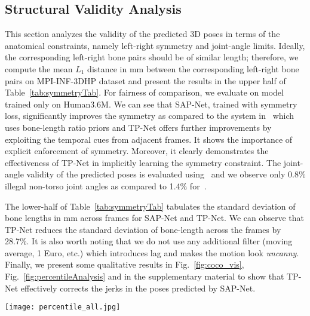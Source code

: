 \documentclass[runningheads]{llncs}
\begin{document}
\vspace{-1em}
\subsection{Structural Validity Analysis}
This section analyzes the validity of the predicted 3D poses in terms of the anatomical constraints, namely left-right symmetry and joint-angle limits. Ideally, the corresponding left-right bone pairs should be of similar length; therefore, we compute the mean $L_1$ distance in mm between the corresponding left-right bone pairs on MPI-INF-3DHP dataset and present the results in the upper half of Table~\ref{tab:symmetryTab}. For fairness of comparison, we evaluate on model trained only on Human3.6M. We can see that SAP-Net, trained with symmetry loss, significantly improves the symmetry as compared to the system in~\cite{Zhou_2017_ICCV} which uses bone-length ratio priors and TP-Net offers further improvements by exploiting the temporal cues from adjacent frames. It shows the importance of explicit enforcement of symmetry. Moreover, it clearly demonstrates the effectiveness of TP-Net in implicitly learning the symmetry constraint. The joint-angle validity of the predicted poses is evaluated using~\cite{akhter2015pose} and we observe only 0.8\% illegal non-torso joint angles as compared to 1.4\% for~\cite{Zhou_2017_ICCV}.

The lower-half of Table~\ref{tab:symmetryTab} tabulates the standard deviation of bone lengths in mm across frames for SAP-Net and TP-Net. We can observe that TP-Net reduces the standard deviation of bone-length across the frames by 28.7\%. It is also worth noting that we do not use any additional filter (moving average, 1 Euro, etc.) which introduces lag and makes the motion look \textit{uncanny}. Finally, we present some qualitative results in Fig.~\ref{fig:coco_vis}, Fig.~\ref{fig:percentileAnalysis} and in the supplementary material to show that TP-Net effectively corrects the jerks in the poses predicted by SAP-Net.

\vspace{1.5em}



\begin{figure*}[t]
	\centering
	\texttt{[image: percentile\_all.jpg]}
	\vspace{-2em}
    \caption{Percentile analysis on Human3.6M (top row), MPI-INF-3DHP (middle row) and MPII (bottom row) datasets. The results are displayed at $15^{th}$, $30^{th}$, $60^{th}$ and $90^{th}$ percentile of error (MPJE for Human3.6M and MPI-INF-3DHP, 2D PCK for MPII) from left to right.}
    \label{fig:percentileAnalysis}
    \vspace{-2em}
\end{figure*}
\end{document}
